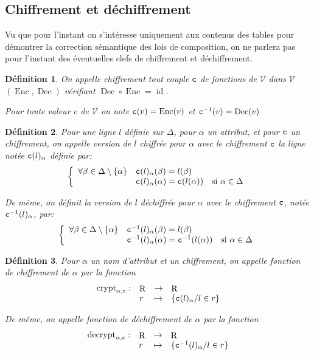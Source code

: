 \documentclass[french]{article}
\DeclareMathOperator{\crypt}{crypt}
\DeclareMathOperator{\decrypt}{decrypt}
\DeclareMathOperator{\id}{id}
\DeclareMathOperator{\R}{R}
\DeclareMathOperator{\enc}{Enc}
\DeclareMathOperator{\dec}{Dec}
\newcommand\typeT[1]{\text{\ttfamily #1}}
\newcommand{\decryptArgs}[2]{\decrypt_{#1 , \typeT{#2}}}
\newcommand{\cryptArgs}[2]{\crypt_{#1 , \typeT{#2}}}
\newcommand{\decryptCAlpha}{\decryptArgs{\alpha}{c}}
\newcommand{\cryptCAlpha}{\cryptArgs{\alpha}{c}}
\newcommand{\val}{\mathcal{V}}
\newcommand{\cy}[1]{\typeT{c}(#1)}
\newcommand{\dc}[1]{\typeT{c}^{-1}(#1)}
\newtheorem{defi}{Définition}
\begin{document}
\subsection*{Chiffrement et déchiffrement}
Vu que pour l'instant on s'intéresse uniquement aux contenus des 
tables pour démontrer la correction sémantique des lois
de composition, on ne parlera pas pour l'instant
des éventuelles clefs de chiffrement et déchiffrement.

\begin{defi}
	On appelle \emph{chiffrement} tout couple $\typeT{c}$ de fonctions
	de $\val$ dans $\val$
	$(\enc, \dec)$
	vérifiant
	$\displaystyle \dec \circ \enc = \id$.
	
	Pour toute valeur $v$ de $\val$
	on note $\cy{v} = \enc(v)$
	et $\dc{v} = \dec(v)$
\end{defi}

\begin{defi}
	Pour une ligne $l$ définie sur $\Delta$, pour $\alpha$ un attribut,
	et pour $\typeT{c}$ un chiffrement,
	on appelle \emph{version de $l$ chiffrée pour $\alpha$ avec le chiffrement
		$\typeT{c}$}
	la ligne notée $\cy{l}_\alpha$ définie par:
	$$
	\left\lbrace
	\begin{array}{lll}
	\forall \beta \in \Delta \setminus \{\alpha\} & \cy{l}_\alpha(\beta) = l(\beta) & \\
	& \cy{l}_\alpha(\alpha) = \cy{l(\alpha)} & \text{si $\alpha \in \Delta$}
	\end{array}
	\right.
	$$
	
	De même, on définit la \emph{version de $l$ déchiffrée pour $\alpha$ avec le chiffrement
		$\typeT{c}$}, notée $\dc{l}_\alpha$, par:
	$$
	\left\lbrace
	\begin{array}{lll}
	\forall \beta \in \Delta \setminus \{\alpha\} & \dc{l}_\alpha(\beta) = l(\beta) & \\
	& \dc{l}_\alpha(\alpha) = \dc{l(\alpha)} & \text{si $\alpha \in \Delta$}
	\end{array}
	\right.
	$$
\end{defi}

\begin{defi}
	Pour $\alpha$ un nom d'attribut
	et \typeT{c} un chiffrement,
	on appelle \emph{fonction de chiffrement de $\alpha$ par \typeT{c}}
	la fonction
	$$
	\begin{array}{llcl}
	\cryptCAlpha : & \R & \rightarrow & \R \\
		&	r	&	\mapsto & \{ \cy{l}_\alpha / l \in r \}
	\end{array}
	$$
	
	De même, on appelle \emph{fonction de déchiffrement de $\alpha$ par \typeT{c}}
	la fonction
	$$
	\begin{array}{llcl}
	\decryptCAlpha : & \R & \rightarrow & \R \\
	&	r	&	\mapsto & \{ \dc{l}_\alpha / l \in r \}
	\end{array}
	$$
\end{defi}
\end{document}
